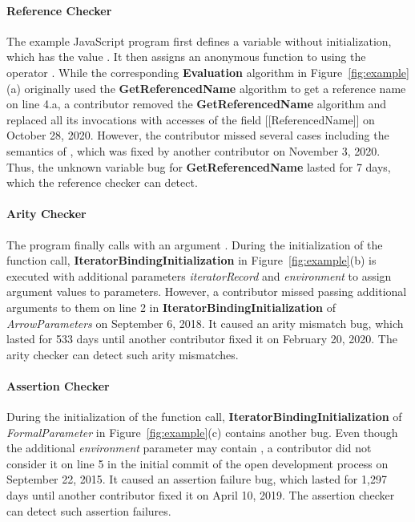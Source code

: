 \paragraph{Reference Checker} The example JavaScript program first defines a
variable  without initialization, which has the value .
It then assigns an anonymous function to  using the operator .
While the corresponding \textbf{Evaluation} algorithm in Figure~\ref{fig:example}(a) originally
used the \textbf{GetReferencedName} algorithm to get a reference name on line 4.a,
a contributor removed the \textbf{GetReferencedName} algorithm and replaced all its
invocations with accesses of the field [[ReferencedName]] on October 28, 2020.
However, the contributor missed several cases including the semantics of
, which was fixed by another contributor on November 3, 2020.
Thus, the unknown variable bug for \textbf{GetReferencedName} lasted for 7 days,
which the reference checker can detect.

\paragraph{Arity Checker} The program finally calls  with an argument .
During the initialization of the function call, \textbf{IteratorBindingInitialization}
in Figure~\ref{fig:example}(b) is executed with additional parameters \textit{iteratorRecord} and
\textit{environment} to assign argument values to parameters.
However, a contributor missed passing additional arguments to them on line 2 in
\textbf{IteratorBindingInitialization} of \textit{ArrowParameters} on September 6, 2018.
It caused an arity mismatch bug, which lasted for 533 days until another
contributor fixed it on February 20, 2020. The arity checker can detect such arity mismatches.

\paragraph{Assertion Checker} During the initialization of the function call,
\textbf{IteratorBindingInitialization} of \textit{FormalParameter} in Figure~\ref{fig:example}(c)
contains another bug.
Even though the additional \textit{environment} parameter may contain ,
a contributor did not consider it on line 5 in the initial commit of the open development process
on September 22, 2015.  It caused an assertion failure bug, which lasted for 1,297 days until another
contributor fixed it on April 10, 2019.
The assertion checker can detect such assertion failures.


